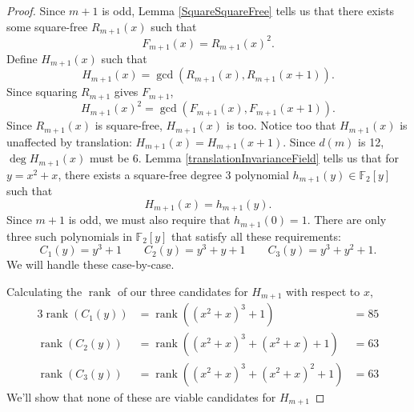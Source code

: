 \documentclass[a4paper]{article}
\newcommand{\F}{\mathbb{F}}
\begin{document}
\begin{proof}
		Since $m+1$ is odd, Lemma \ref{SquareSquareFree} tells us that there exists some square-free $R_{m+1}(x)$ such that
		\begin{equation*}
			F_{m+1}(x) = R_{m+1}(x)^2.
		\end{equation*}
		Define $H_{m+1}(x)$ such that
		\begin{equation*}
			H_{m+1}(x) = \gcd{\left(R_{m+1}(x),R_{m+1}(x+1)\right)}.
		\end{equation*}
		Since squaring $R_{m+1}$ gives $F_{m+1}$,
		\begin{equation*}
			 H_{m+1}(x)^2 = \gcd{\left(F_{m+1}(x),F_{m+1}(x+1)\right)}.
		\end{equation*}
		Since $R_{m+1}(x)$ is square-free, $H_{m+1}(x)$ is too.
		Notice too that $H_{m+1}(x)$ is unaffected by translation: $H_{m+1}(x) = H_{m+1}(x+1)$.
		Since $d(m)$ is 12, $\deg H_{m+1}(x)$ must be 6.
		Lemma \ref{translationInvarianceField} tells us that for $y = x^2 + x$, there exists a square-free degree 3 polynomial $h_{m+1}(y) \in \F_2[y]$ such that
		\begin{equation*}
			H_{m+1}(x) = h_{m+1}(y).
		\end{equation*}
		Since $m+1$ is odd, we must also require that $h_{m+1}(0) = 1$.
		There are only three such polynomials in $\F_2[y]$ that satisfy all these requirements:
		\begin{equation*}
			C_1(y) = y^3 + 1 \qquad C_2(y) = y^3 + y + 1 \qquad C_3(y) = y^3 + y^2 + 1.
		\end{equation*}
		We will handle these case-by-case.
		
		Calculating the $\operatorname{rank}$ of our three candidates for $H_{m+1}$ with respect to $x$,
		\begin{alignat*}{3}
			\operatorname{rank}(C_1(y)) &= \operatorname{rank}{\left((x^2+x)^3 + 1\right)} &= 85 \\
			\operatorname{rank}(C_2(y)) &= \operatorname{rank}{\left((x^2+x)^3 + (x^2+x) + 1\right)} &= 63 \\
			\operatorname{rank}(C_3(y)) &= \operatorname{rank}{\left((x^2+x)^3 + (x^2+x)^2 + 1\right)} &= 63
		\end{alignat*}
		We'll show that none of these are viable candidates for $H_{m+1}$
	

\end{proof}
\end{document}
